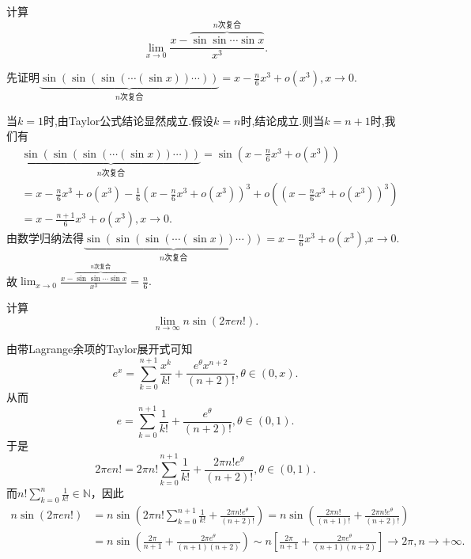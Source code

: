 \documentclass[../../main.tex]{subfiles}%
\begin{document}
\begin{example}
计算
\[
\lim_{x\rightarrow 0} \frac{x-\overset{n\text{次复合}}{\overbrace{\sin\sin \cdots \sin x}}}{x^3}.
\]
\end{example}
\begin{solution}

先证明\(\underbrace{\sin(\sin(\sin(\cdots (\sin x))\cdots))}_{n\text{次复合}} = x - \frac{n}{6}x^3 + o(x^3),x\to0\).

当\(k = 1\)时,由Taylor公式结论显然成立.假设\(k=n\)时,结论成立.则当\(k=n + 1\)时,我们有
\begin{align*}
&\underbrace{\sin(\sin(\sin(\cdots (\sin x))\cdots))}_{n\text{次复合}} = \sin\left(x - \frac{n}{6}x^3 + o(x^3)\right)
\\
&= x - \frac{n}{6}x^3 + o(x^3) - \frac{1}{6}\left(x - \frac{n}{6}x^3 + o(x^3)\right)^3 + o\left(\left(x - \frac{n}{6}x^3 + o(x^3)\right)^3\right)
\\
&= x - \frac{n + 1}{6}x^3 + o(x^3),x\to0.
\end{align*}
由数学归纳法得\(\underbrace{\sin(\sin(\sin(\cdots (\sin x))\cdots))}_{n\text{次复合}} = x - \frac{n}{6}x^3 + o(x^3)\),$x\to0$.
故$\lim_{x\rightarrow 0} \frac{x-\overset{n\text{次复合}}{\overbrace{\sin\sin \cdots \sin x}}}{x^3}=\frac{n}{6}.$

\end{solution}

\begin{example}
计算
\[
\lim_{n\rightarrow \infty}n\sin(2\pi en!).
\]
\end{example}
\begin{solution}

由带Lagrange余项的Taylor展开式可知
\[
e^x = \sum_{k = 0}^{n + 1}\frac{x^k}{k!} + \frac{e^{\theta}x^{n + 2}}{(n + 2)!}, \theta \in (0, x).
\]
从而
\[
e = \sum_{k = 0}^{n + 1}\frac{1}{k!} + \frac{e^{\theta}}{(n + 2)!}, \theta \in (0, 1).
\]
于是
\[
2\pi en! = 2\pi n!\sum_{k = 0}^{n + 1}\frac{1}{k!} + \frac{2\pi n!e^{\theta}}{(n + 2)!}, \theta \in (0, 1).
\]
而\(n!\sum_{k = 0}^n\frac{1}{k!} \in \mathbb{N}\)，因此
\begin{align*}
n\sin(2\pi en!)&=n\sin\left(2\pi n!\sum_{k = 0}^{n + 1}\frac{1}{k!} + \frac{2\pi n!e^{\theta}}{(n + 2)!}\right)
=n\sin\left(\frac{2\pi n!}{(n + 1)!} + \frac{2\pi n!e^{\theta}}{(n + 2)!}\right)\\
&=n\sin\left(\frac{2\pi}{n + 1} + \frac{2\pi e^{\theta}}{(n + 1)(n + 2)}\right)
\sim n\left[\frac{2\pi}{n + 1} + \frac{2\pi e^{\theta}}{(n + 1)(n + 2)}\right] \to 2\pi, n \to +\infty.
\end{align*} 

\end{solution}
\end{document}
